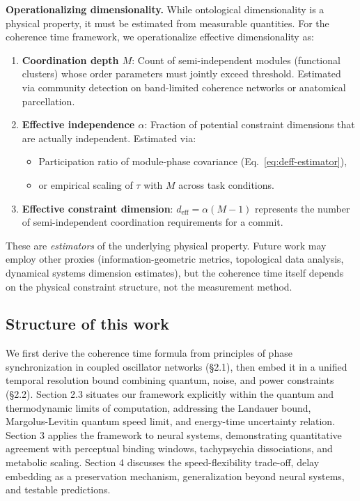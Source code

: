 \documentclass[12pt]{article}
\begin{document}
\textbf{Operationalizing dimensionality.} While ontological dimensionality is a physical property, it must be estimated from measurable quantities. For the coherence time framework, we operationalize effective dimensionality as:
\begin{enumerate}
\item \textbf{Coordination depth $M$}: Count of semi-independent modules (functional clusters) whose order parameters must jointly exceed threshold. Estimated via community detection on band-limited coherence networks or anatomical parcellation.
\item \textbf{Effective independence $\alpha$}: Fraction of potential constraint dimensions that are actually independent. Estimated via:
\begin{itemize}
\item Participation ratio of module-phase covariance (Eq.~\ref{eq:deff-estimator}),
\item or empirical scaling of $\tau$ with $M$ across task conditions.
\end{itemize}
\item \textbf{Effective constraint dimension}: $d_{\mathrm{eff}} = \alpha(M-1)$ represents the number of semi-independent coordination requirements for a commit.
\end{enumerate}
These are \emph{estimators} of the underlying physical property. Future work may employ other proxies (information-geometric metrics, topological data analysis, dynamical systems dimension estimates), but the coherence time itself depends on the physical constraint structure, not the measurement method.

\subsection{Structure of this work}

We first derive the coherence time formula from principles of phase synchronization in coupled oscillator networks (\S2.1), then embed it in a unified temporal resolution bound combining quantum, noise, and power constraints (\S2.2). Section 2.3 situates our framework explicitly within the quantum and thermodynamic limits of computation, addressing the Landauer bound, Margolus-Levitin quantum speed limit, and energy-time uncertainty relation. Section 3 applies the framework to neural systems, demonstrating quantitative agreement with perceptual binding windows, tachypsychia dissociations, and metabolic scaling. Section 4 discusses the speed-flexibility trade-off, delay embedding as a preservation mechanism, generalization beyond neural systems, and testable predictions.
\end{document}
